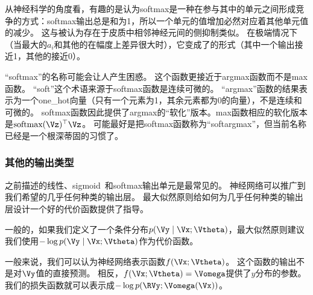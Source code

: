 从神经科学的角度看，有趣的是认为softmax是一种在参与其中的单元之间形成竞争的方式：softmax输出总是和为1，所以一个单元的值增加必然对应着其他单元值的减少。
这与被认为存在于皮质中相邻神经元间的侧抑制类似。
在极端情况下（当最大的$a_i$和其他的在幅度上差异很大时），它变成了的形式（其中一个输出接近1，其他的接近0）。

``softmax''的名称可能会让人产生困惑。
这个函数更接近于argmax函数而不是max函数。
``soft''这个术语来源于softmax函数是连续可微的。
``argmax''函数的结果表示为一个\gls{one_hot}向量（只有一个元素为1，其余元素都为0的向量），不是连续和可微的。
softmax函数因此提供了argmax的``软化''版本。max函数相应的软化版本是$\text{softmax}(\Vz)^\top \Vz$。
可能最好是把softmax函数称为``softargmax''，但当前名称已经是一个根深蒂固的习惯了。


\subsubsection{其他的输出类型}
\label{sec:other_output_types}

之前描述的线性、\gls{sigmoid}~和softmax输出单元是最常见的。
神经网络可以推广到我们希望的几乎任何种类的输出层。
最大似然原则给如何为几乎任何种类的输出层设计一个好的代价函数提供了指导。

一般的，如果我们定义了一个条件分布$p(\Vy\mid\Vx; \Vtheta)$，最大似然原则建议我们使用$-\log p(\Vy\mid \Vx;\Vtheta)$作为代价函数。

一般来说，我们可以认为神经网络表示函数$f(\Vx;\Vtheta)$。
这个函数的输出不是对$\Vy$值的直接预测。
相反，$f(\Vx;\Vtheta)=\Vomega$提供了$y$分布的参数。
我们的损失函数就可以表示成$-\log p(\RVy; \Vomega(\Vx))$。

